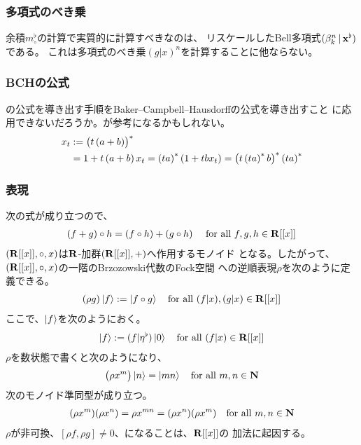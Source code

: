 {\subsubsection{多項式のべき乗}\label{s3:多項式のべき乗} %
	余積$m_\circ^\flat$の計算で実質的に計算すべきなのは、
	リスケールしたBell多項式$(\beta^n_k\,\vert\,\mathbf{x}^\flat)$である。
	これは多項式のべき乗$(g|x)^n$を計算することに他ならない。
\subsubsection{BCHの公式}\label{s3:BCHの公式} %
	{\Faa}の公式を導き出す手順をBaker–Campbell–Hausdorffの公式を導き出すこと
	に応用できないだろうか。\cite{casas:2009}が参考になるかもしれない。
	\begin{equation*}\begin{split}
		x_t &:= \mathinner{\bigl({t\mathinner{\left({a+b}\right)}}\bigr)}^* \\
		&= 1 + t\mathinner{\left({a+b}\right)}x_t = \mathinner{\left({ta}\right)}^*\mathinner{\left({1 + tbx_t}\right)}
		= \mathinner{\bigl({t\mathinner{\left({ta}\right)}^*b}\bigr)}^*\mathinner{\left({ta}\right)}^*
	\end{split}\end{equation*}
\subsubsection{表現}\label{s3:表現} %
	次の式が成り立つので、
	\begin{equation*}\begin{split}
		(f+g)\circ h = (f\circ h) + (g\circ h) 
		\quad\text{ for all } f,g,h\in\mathbf{R}[[x]] \\
	\end{split}\end{equation*}
	$(\mathbf{R}[[x]],\circ,x)$は$\mathbf{R}$-加群$(\mathbf{R}[[x]],+)$へ作用するモノイド
	となる。したがって、$(\mathbf{R}[[x]],\circ,x)$の一階のBrzozowski代数のFock空間
	への逆順表現$\rho$を次のように定義できる。
	\begin{equation*}\begin{split}
		(\rho g)\mathinner{|{f}\rangle} := \mathinner{|{f\circ g}\rangle}
		\quad\text{for all } (f|x),(g|x)\in\mathbf{R}[[x]]
	\end{split}\end{equation*}
	ここで、$\mathinner{|{f}\rangle}$を次のようにおく。
	\begin{equation*}\begin{split}
		\mathinner{|{f}\rangle} := (f|\eta^\flat)\mathinner{|{0}\rangle} \quad\text{for all } (f|x)\in\mathbf{R}[[x]]
	\end{split}\end{equation*}
	$\rho$を数状態で書くと次のようになり、
	\begin{equation*}\begin{split}
		\mathinner{\bigl({\rho x^m}\bigr)}\mathinner{|{n}\rangle} = \mathinner{|{mn}\rangle}
		\quad\text{for all } m,n\in\mathbf{N}
	\end{split}\end{equation*}
	次のモノイド準同型が成り立つ。
	\begin{equation*}\begin{split}
		(\rho x^m)(\rho x^n) = \rho x^{mn} = (\rho x^n)(\rho x^m)
		\quad\text{for all } m,n\in\mathbf{N}
	\end{split}\end{equation*}
	$\rho$が非可換、$[\rho f,\rho g]\neq 0$、になることは、$\mathbf{R}[[x]]$の
	加法に起因する。
%
}\endgroup %
